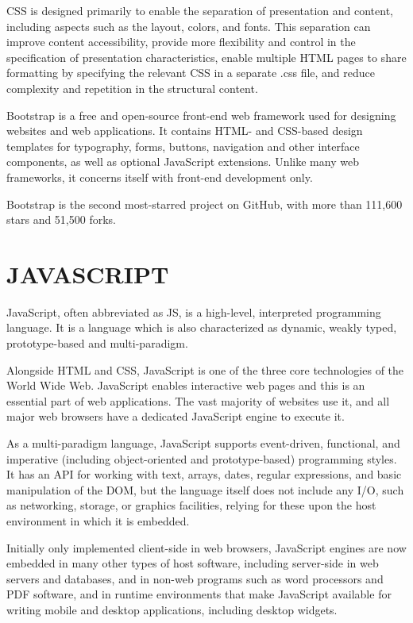 CSS is designed primarily to enable the separation of presentation and content, including aspects such as the layout, colors, and fonts. This separation can improve content accessibility, provide more flexibility and control in the specification of presentation characteristics, enable multiple HTML pages to share formatting by specifying the relevant CSS in a separate .css file, and reduce complexity and repetition in the structural content.

Bootstrap is a free and open-source front-end web framework used for  designing websites and web applications. It contains HTML- and CSS-based design templates for typography, forms, buttons, navigation and other interface components, as well as optional JavaScript extensions. Unlike many web frameworks, it concerns itself with front-end development only.

Bootstrap is the second most-starred project on GitHub, with more than 111,600 stars and 51,500 forks.
\section{JAVASCRIPT}
JavaScript, often abbreviated as JS, is a high-level, interpreted programming language. It is a language which is also characterized as dynamic, weakly typed, prototype-based and multi-paradigm.

Alongside HTML and CSS, JavaScript is one of the three core technologies of the World Wide Web. JavaScript enables interactive web pages and this is an essential part of web applications. The vast majority of websites use it, and all major web browsers have a dedicated JavaScript engine to execute it.

As a multi-paradigm language, JavaScript supports event-driven, functional, and imperative (including object-oriented and prototype-based) programming styles. It has an API for working with text, arrays, dates, regular expressions, and basic manipulation of the DOM, but the language itself does not include any I/O, such as networking, storage, or graphics facilities, relying for these upon the host environment in which it is embedded.

Initially only implemented client-side in web browsers, JavaScript engines are now embedded in many other types of host software, including server-side in web servers and databases, and in non-web programs such as word processors and PDF software, and in runtime environments that make JavaScript available for writing mobile and desktop applications, including desktop widgets.

